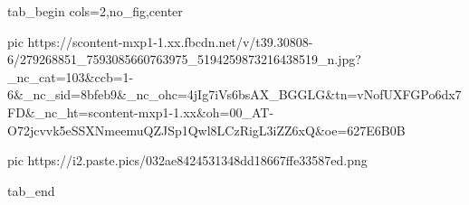  
 
 
 
 


\ifcmt
  tab_begin cols=2,no_fig,center

     pic https://scontent-mxp1-1.xx.fbcdn.net/v/t39.30808-6/279268851_7593085660763975_5194259873216438519_n.jpg?_nc_cat=103&ccb=1-6&_nc_sid=8bfeb9&_nc_ohc=4jIg7iVs6bsAX_BGGLG&tn=vNofUXFGPo6dx7FD&_nc_ht=scontent-mxp1-1.xx&oh=00_AT-O72jcvvk5eSSXNmeemuQZJSp1Qwl8LCzRigL3iZZ6xQ&oe=627E6B0B

		 pic https://i2.paste.pics/032ae8424531348dd18667ffe33587ed.png

  tab_end
\fi
